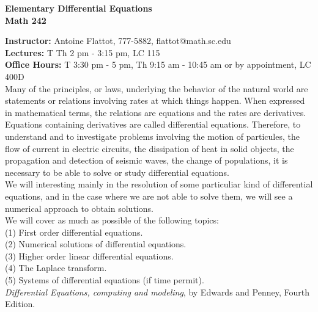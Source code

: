 \documentclass[11pt]{amsart}
\begin{document}
\thispagestyle{empty}
\begin{center}
\Large{\bf Elementary Differential Equations \\ Math 242}
\end{center}
\vspace*{0.8cm}
\large{{\bf Instructor:} Antoine Flattot, 777-5882, flattot@math.sc.edu}\\
\large{{\bf Lectures:} T Th 2 pm - 3:15 pm, LC 115}\\
\large{{\bf Office Hours:} T 3:30 pm - 5 pm, Th 9:15 am - 10:45 am or by appointment, LC 400D}\\[0.8cm]
 Many of the principles, or laws, underlying the behavior of the natural world
are statements or relations involving rates at which things happen. When expressed in mathematical
terms, the relations are equations and the rates are derivatives. Equations containing derivatives are
called differential equations. Therefore, to understand and to investigate problems involving the 
motion of particules, the flow of current in electric circuits, the dissipation of heat in solid objects,
the propagation and detection of seismic waves, the change of populations, it is necessary to 
be able to solve or study differential equations.\\
We will interesting mainly in the resolution of some particuliar kind of differential equations, and in the case where we are not able to solve them, we will see a numerical approach to obtain solutions.\\[0.3cm] 
 We will cover as much as possible of the following topics:\\
\hspace*{0.3cm} (1) First order differential equations.\\
\hspace*{0.3cm} (2) Numerical solutions of differential equations.\\
\hspace*{0.3cm} (3) Higher order linear differential equations.\\
\hspace*{0.3cm} (4) The Laplace transform.\\
\hspace*{0.3cm} (5) Systems of differential equations (if time permit).\\[0.3cm]
 {\em Differential Equations, computing and modeling}, by Edwards and Penney,
Fourth Edition.\\[0.3cm]
\end{document}
